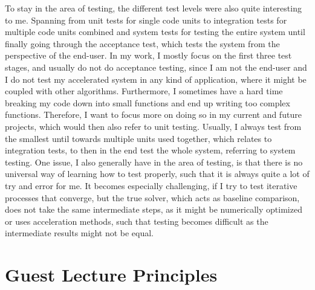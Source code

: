 \documentclass[11pt]{article}
\begin{document}
To stay in the area of testing, the different test levels were also quite interesting to me. Spanning from unit tests for single code units to integration tests for multiple code units combined and system tests for testing the entire system until finally going through the acceptance test, which tests the system from the perspective of the end-user. In my work, I mostly focus on the first three test stages, and usually do not do acceptance testing, since I am not the end-user and I do not test my accelerated system in any kind of application, where it might be coupled with other algorithms. Furthermore, I sometimes have a hard time breaking my code down into small functions and end up writing too complex functions. Therefore, I want to focus more on doing so in my current and future projects, which would then also refer to unit testing. Usually, I always test from the smallest until towards multiple units used together, which relates to integration tests, to then in the end test the whole system, referring to system testing. One issue, I also generally have in the area of testing, is that there is no universal way of learning how to test properly, such that it is always quite a lot of try and error for me. It becomes especially challenging, if I try to test iterative processes that converge, but the true solver, which acts as baseline comparison, does not take the same intermediate steps, as it might be numerically optimized or uses acceleration methods, such that testing becomes difficult as the intermediate results might not be equal.

\section{Guest Lecture Principles} \label{ch:guest_lecture}
\end{document}
